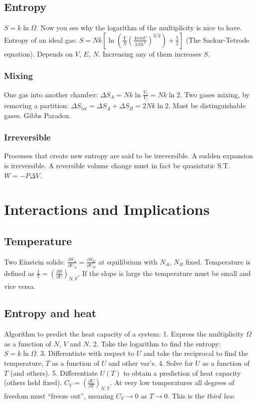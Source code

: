 \documentclass[11pt,twocolumn]{amsart}
\begin{document}
\subsection{Entropy}
$S = k\ln\Omega$. Now you see why the logarithm of the multiplicity is nice to have. Entropy of an ideal gas: $S = Nk \left[\ln\left(\frac{V}{N}\left(\frac{4\pi mU}{3Nh^2}\right)^{3/2} \right) + \frac{5}{2} \right]$ (The Sackur-Tetrode equation). Depends on $V$, $E$, $N$. Increasing any of them increases $S$. 
\subsubsection{Mixing} One gas into another chamber: $\Delta S_A = Nk\ln\frac{V_f}{V_i}=Nk\ln 2$. Two gases mixing, by removing a partition: $\Delta S_{tot} = \Delta S_A + \Delta S_B = 2Nk \ln 2$. Must be distinguishable gases. Gibbs Paradox.
\subsubsection{Irreversible} Processes that create new entropy are said to be irreversible. A sudden expansion is irreversible. A reversible volume change must in fact be quasistatic S.T. $W = - P\Delta V $.

\section{Interactions and Implications}
\subsection{Temperature}
Two Einstein solids: $\frac{\partial S_A}{\partial U_A} = \frac{\partial S_B}{\partial U_B}$ at equilibrium with $N_A$, $N_B$ fixed. Temperature is defined as $\frac{1}{T} = \left(\frac{\partial S}{\partial U} \right)_{N,V}$. If the slope is large the temperature must be small and vice versa.
\subsection{Entropy and heat}
Algorithm to predict the heat capacity of a system: 1. Express the multiplicity $\Omega$ as a function of $N$, $V$ and $N$. 2. Take the logarithm to find the entropy: $S=k\ln\Omega$. 3. Differentiate with respect to $U$ and take the reciprocal to find the temperature, $T$ as a function of $U$ and other var's. 4. Solve for $U$ as a function of $T$ (and others). 5. Differentiate $U(T)$ to obtain a prediction of heat capacity (others held fixed). $C_V = \left(\frac{\partial U}{\partial T} \right)_{N,V}$. At very low temperatures all degrees of freedom must ``freeze out'', meaning $C_V \rightarrow 0$ as $T \rightarrow 0$. This is the \emph{third law}.
\end{document}
